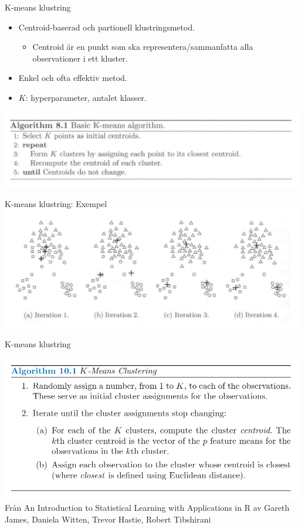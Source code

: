 \documentclass[10pt,english]{beamer}
\begin{document}
\begin{frame}{K-means klustring}

    \begin{itemize}
        \item Centroid-baserad och partionell klustringsmetod.
        \begin{itemize}
            \item Centroid är en punkt som ska representera/sammanfatta alla observationer i ett kluster.
        \end{itemize}
        \item Enkel och ofta effektiv metod.
        \item $K$: hyperparameter, antalet klasser.
    \end{itemize}

    \includegraphics[width=\textwidth]{figs/basic K-means.png}
    
\end{frame}

\begin{frame}{K-means klustring: Exempel}
    \includegraphics[width=1.1\textwidth]{figs/k-means Illustration1.png}
\end{frame}

\begin{frame}{K-means klustring}

    \includegraphics[width=\textwidth]{figs/K-means clustering.png}
    Från An Introduction to Statistical Learning with Applications in R av Gareth James, Daniela Witten, Trevor
Hastie, Robert Tibshirani
    
\end{frame}
\end{document}
